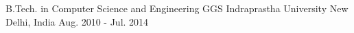

\begin{cventries}

  \cventry
    {B.Tech. in Computer Science and Engineering} %
    {GGS Indraprastha University} %
    {New Delhi, India} %
    {Aug. 2010 - Jul. 2014} %
    {
    }

\end{cventries}
